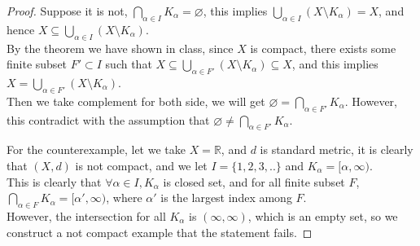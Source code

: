 \begin{proof}
    Suppose it is not, $\bigcap_{\alpha \in I} K_\alpha = \varnothing$, this implies $\bigcup_{\alpha \in I} (X \setminus K_\alpha) = X$, and hence $X \subseteq \bigcup_{\alpha \in I} (X \setminus K_\alpha)$. \\
    By the theorem we have shown in class, since $X$ is compact, there exists some finite subset $F'\subset I$ such that $X \subseteq \bigcup_{\alpha \in F'} (X \setminus K_\alpha) \subseteq X$, and this implies $X = \bigcup_{\alpha \in F'} (X \setminus K_\alpha)$. \\
    Then we take complement for both side, we will get $\varnothing = \bigcap_{\alpha \in F'} K_\alpha$. However, this contradict with the assumption that $\varnothing \neq \bigcap_{\alpha \in F'} K_\alpha$.

    For the counterexample, let we take $X = \mathbb{R}$, and $d$ is standard metric, it is clearly that $(X,d)$ is not compact, and we let $I = \{1,2,3,..\}$ and $K_{\alpha} = [\alpha, \infty)$. \\
    This is clearly that $\forall \alpha \in I, K_{\alpha}$ is closed set, and for all finite subset $F$, $\bigcap_{\alpha \in F} K_\alpha = [\alpha', \infty)$, where $\alpha' $ is the largest index among $F$. \\
    However, the intersection for all $K_{\alpha}$ is $(\infty, \infty)$, which is an empty set, so we construct a not compact example that the statement fails.
\end{proof}

